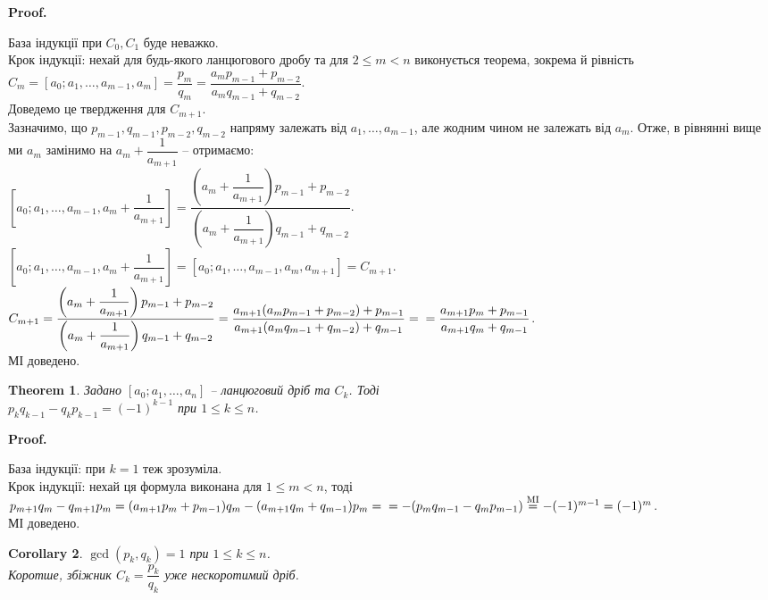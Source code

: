 \documentclass[a4paper, 10pt]{article}
\makeatletter
\theoremstyle{theoremdd}
\newtheorem{theorem}{Theorem}[subsection]
\theoremstyle{theoremdd}
\theoremstyle{theoremdd}
\theoremstyle{theoremdd}
\theoremstyle{theoremdd}
\theoremstyle{theoremdd}
\theoremstyle{theoremdd}
\theoremstyle{theoremdd}
\newtheorem{corollary}[theorem]{Corollary}
\renewenvironment{proof}[1][Proof.\\]{\par
\pushQED{\hfill \qed}%
\normalfont \topsep6\p@\@plus6\p@\relax
\trivlist
\item\relax
{\bfseries
#1\@addpunct{.}}\hspace\labelsep\ignorespaces
}{%
\popQED\endtrivlist\@endpefalse
}
\makeatother
\begin{document}
\begin{proof}
База індукції при $C_0,C_1$ буде неважко.\\
Крок індукції: нехай для будь-якого ланцюгового дробу та для $2 \leq m < n$ виконується теорема, зокрема й рівність \\ $C_m = [a_0;a_1,\dots,a_{m-1},a_m] =\dfrac{p_m}{q_m} = \dfrac{a_m p_{m-1} + p_{m-2}}{a_m q_{m-1} + q_{m-2}}$. \\
Доведемо це твердження для $C_{m+1}$.\\
Зазначимо, що $p_{m-1},q_{m-1},p_{m-2},q_{m-2}$ напряму залежать від $a_1,\dots,a_{m-1}$, але жодним чином не залежать від $a_m$. Отже, в рівнянні вище ми $a_m$ замінимо на $a_m + \dfrac{1}{a_{m+1}}$ -- отримаємо:\\
$\left[a_0;a_1,\dots,a_{m-1},a_m+\dfrac{1}{a_{m+1}} \right] = \dfrac{\left( a_m + \dfrac{1}{a_{m+1}} \right)p_{m-1} + p_{m-2}}{\left( a_m + \dfrac{1}{a_{m+1}} \right)q_{m-1} + q_{m-2}}$.\\
$\left[a_0;a_1,\dots,a_{m-1},a_m + \dfrac{1}{a_{m+1}}\right] = [a_0;a_1,\dots,a_{m-1},a_m,a_{m+1}] = C_{m+1}$.\\
$C_{m+1} = \dfrac{\left( a_m + \dfrac{1}{a_{m+1}} \right)p_{m-1} + p_{m-2}}{\left( a_m + \dfrac{1}{a_{m+1}} \right)q_{m-1} + q_{m-2}} = \dfrac{a_{m+1}(a_m p_{m-1}+p_{m-2}) + p_{m-1}}{a_{m+1}(a_m q_{m-1} + q_{m-2}) + q_{m-1}} = \\ = \dfrac{a_{m+1}p_m + p_{m-1}}{a_{m+1}q_m + q_{m-1}}$.\\
МІ доведено.
\end{proof}

\begin{theorem}
\label{p_k q_k-1 - q_k p_k-1 = (-1)^k-1}
Задано $[a_0;a_1,\dots,a_n]$ -- ланцюговий дріб та $C_k$. Тоді \\ $p_k q_{k-1} - q_k p_{k-1} = (-1)^{k-1}$ при $1 \leq k \leq n$.
\end{theorem}

\begin{proof}
База індукції: при $k = 1$ теж зрозуміла.\\
Крок індукції: нехай ця формула виконана для $1 \leq m < n$, тоді\\
$p_{m+1}q_m - q_{m+1}p_m = (a_{m+1}p_m + p_{m-1})q_m - (a_{m+1}q_m + q_{m-1})p_m = \\ = - (p_mq_{m-1}-q_mp_{m-1}) \overset{\text{MI}}{=} -(-1)^{m-1} = (-1)^m$.\\
МІ доведено.
\end{proof}

\begin{corollary}
$\gcd(p_k,q_k) = 1$ при $1 \leq k \leq n$.\\
Коротше, збіжник $C_k = \dfrac{p_k}{q_k}$ уже нескоротимий дріб.
\end{corollary}
\end{document}
